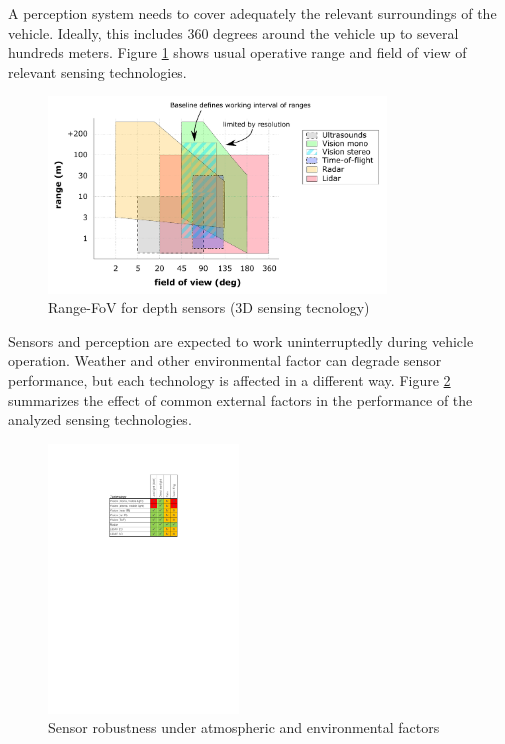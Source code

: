 A perception system needs to cover adequately the relevant surroundings of the
vehicle. Ideally, this includes 360 degrees around the vehicle up to several
hundreds meters. Figure \ref{fig:range-fov} shows usual operative range and
field of view of relevant sensing technologies. 

\begin{figure}[h]
    \centering
    \includegraphics[width=0.8\textwidth]{"img/plot_range-fov"}
    \caption{Range-FoV for depth sensors (3D sensing tecnology)}
    \label{fig:range-fov}
\end{figure}

Sensors and perception are expected to work uninterruptedly during vehicle 
operation. Weather and other environmental factor can degrade sensor
performance, but each technology is affected in a different way. 
Figure \ref{fig:sensors-environ} summarizes the effect of common external
factors in the performance of the analyzed sensing technologies.

\begin{figure}[h]
    \centering
    \includegraphics[width=0.45\textwidth]{"img/sensors_atmospheric_conditions"}
    \caption{Sensor robustness under atmospheric and environmental factors}
    \label{fig:sensors-environ}
\end{figure}

